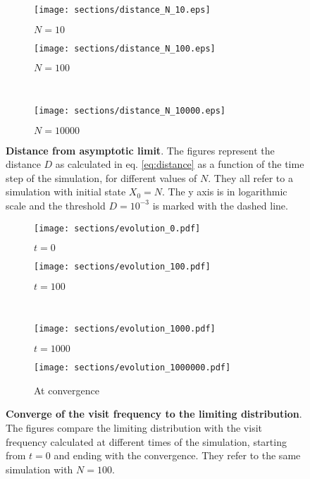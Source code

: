 \begin{figure}[H]
  \begin{subfigure}{.5\textwidth}
      \centering
      \texttt{[image: sections/distance\_N\_10.eps]}
      \caption{$N = 10$}
    \end{subfigure}
    \begin{subfigure}{.5\textwidth}
      \centering
      \texttt{[image: sections/distance\_N\_100.eps]}
      \caption{$N = 100$}
    \end{subfigure}\\
    \begin{center}
    \begin{subfigure}{0.5\textwidth}
      \centering
      \texttt{[image: sections/distance\_N\_10000.eps]}
      \caption{$N = 10000$}
    \end{subfigure}%
  \end{center}

  \captionsetup{width=.9\linewidth}
  \caption{\textbf{Distance from asymptotic limit}. The figures represent the distance $D$ as calculated in eq. \ref{eq:distance} as a function of the time step of the simulation, for different values of $N$. They all refer to a simulation with initial state $X_0 = N$. The y axis is in logarithmic scale and the threshold $D = 10^{-3}$ is marked with the dashed line.}
  \label{fig:distances}
\end{figure}

\begin{figure}
  \begin{subfigure}{.5\textwidth}
      \centering
      \texttt{[image: sections/evolution\_0.pdf]}
      \caption{$t = 0$}
    \end{subfigure}
    \begin{subfigure}{.5\textwidth}
      \centering
      \texttt{[image: sections/evolution\_100.pdf]}
      \caption{$t = 100$}
    \end{subfigure}\\
    \begin{subfigure}{0.5\textwidth}
      \centering
      \texttt{[image: sections/evolution\_1000.pdf]}
      \caption{$t = 1000$}
    \end{subfigure}%
    \begin{subfigure}{0.5\textwidth}
      \centering
      \texttt{[image: sections/evolution\_1000000.pdf]}
      \caption{At convergence}
    \end{subfigure}

  \captionsetup{width=.9\linewidth}
  \caption{\textbf{Converge of the visit frequency to the limiting distribution}. The figures compare the limiting distribution with the visit frequency calculated at different times of the simulation, starting from $t = 0$ and ending with the convergence. They refer to the same simulation with $N = 100$.}
  \label{fig:evolution}
\end{figure}


